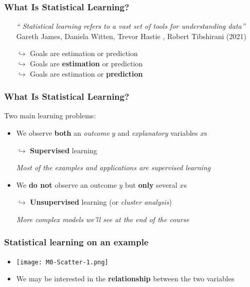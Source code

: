 \documentclass[xcolor=x11names,compress, aspectratio=169]{beamer}
\renewcommand{\(}{\begin{columns}}
\renewcommand{\)}{\end{columns}}
\newcommand{\<}[1]{\begin{column}{#1}}
\renewcommand{\>}{\end{column}}
\begin{document}
\begin{frame} %
\frametitle{What Is Statistical Learning?}
\pause
\begin{itemize}[<+->]
\item[]
\begin{center}
\emph{`` Statistical learning refers to a vast set of tools for understanding data''}\\

{\scriptsize Gareth James,  Daniela Witten, Trevor Hastie ,  Robert Tibshirani (2021)}\\
\vspace{0.5cm}
\end{center}
\pause
    { $\hookrightarrow$ Goals are estimation or prediction \\ }
    { $\hookrightarrow$ Goals are \textbf{estimation} or prediction \\ }
    {$\hookrightarrow$ Goals are estimation or \textbf{prediction} \\ }
 \end{itemize}
\end{frame}


\begin{frame} %
\frametitle{What Is Statistical Learning?}
Two main learning problems:
\pause
\begin{itemize}[<+->]
  \item We observe \textbf{both} an \textit{outcome} $y$ and \textit{explanatory} variables $x$s
   \item[$\hookrightarrow$] \textbf{Supervised} learning
   \item[] \textit{Most of the examples and applications are supervised learning}
   \item We \textbf{do not} observe an outcome $y$ but\textbf{ only} several $x$s
   \item[$\hookrightarrow$] \textbf{Unsupervised} learning (or \textit{cluster analysis})
  \item[] \textit{More complex models we'll see at the end of the course}
 \end{itemize}
\end{frame}


\begin{frame} %
\frametitle{Statistical learning on an example}
 \begin{itemize}
  \item<+->[] \texttt{[image: M0-Scatter-1.png]}
  \item<+->[]  We may be interested in the \textbf{relationship} between the two variables
 \end{itemize}
\end{frame}
\end{document}
